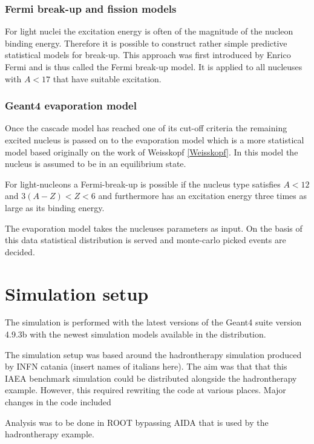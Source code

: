 \subsubsection{Fermi break-up and fission models}

For light nuclei the excitation energy is often of the magnitude of the nucleon binding energy. Therefore it is possible to construct rather simple predictive statistical models for break-up. This approach was first introduced by Enrico Fermi and is thus called the Fermi break-up model. It is applied to all nucleuses with $A < 17$ that have suitable excitation. %

\subsubsection{Geant4 evaporation model}

Once the cascade model has reached one of its cut-off criteria the remaining excited nucleus is passed on to the evaporation model which is a more statistical model based originally on the work of Weisskopf \ref{Weisskopf}. In this model the nucleus is assumed to be in an equilibrium state.

For light-nucleons a Fermi-break-up is possible if the nucleus type satisfies $A < 12$ and $3(A - Z) < Z < 6$ and furthermore has an excitation energy three times as large as its binding energy.

The evaporation model takes the nucleuses parameters as input. On the basis of this data statistical distribution is served and monte-carlo picked events are decided.




\section{Simulation setup} %
The simulation is performed with the latest versions of the Geant4 suite version 4.9.3b with the newest simulation models available in the distribution.

The simulation setup was based around the hadrontherapy simulation produced by INFN catania (insert names of italians here). The aim was that that this IAEA benchmark simulation could be distributed alongside the hadrontherapy example. However, this required rewriting the code at various places. Major changes in the code included

Analysis was to be done in ROOT bypassing AIDA that is used by the hadrontherapy example.

